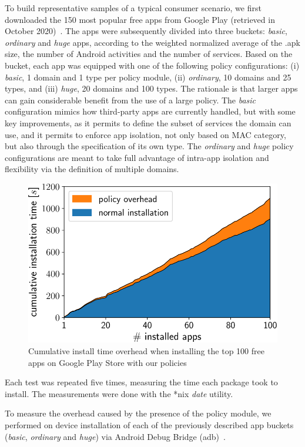 To build representative samples of a typical consumer scenario, we
first downloaded the 150 most popular free apps from Google Play
(retrieved in October 2020)~\cite{seapp_topapps}.  The apps were
subsequently divided into three buckets: \emph{basic}, \emph{ordinary}
and \emph{huge} apps, according to the weighted normalized average of
the .apk size, the number of Android activities and the number of
services.  Based on the bucket, each app was equipped with one of the
following policy configurations: (i) \emph{basic}, 1 domain and 1 type
per policy module, (ii) \emph{ordinary}, 10 domains and 25 types, and
(iii) \emph{huge}, 20 domains and 100 types.  The rationale is that
larger apps can gain considerable benefit from the use of a large
policy.  The \emph{basic} configuration mimics how third-party apps
are currently handled, but with some key improvements, as it permits
to define the subset of services the domain can use, and it permits to
enforce app isolation, not only based on MAC category, but also
through the specification of its own type.  The \emph{ordinary} and
\emph{huge} policy configurations are meant to take full advantage of
intra-app isolation and flexibility via the definition of multiple
domains.
%
\begin{figure}[t]
	\centering
	\includegraphics[width=0.7\columnwidth]{chapters/seapp/data/top100_cumulative}
	\caption[Cumulative install time overhead of the top 100 free apps
      with our policies]{
        \label{fig:seapp_benchmark100} Cumulative install time
        overhead when installing the top 100 free apps on Google Play
        Store with our policies
    }
\end{figure}
%
Each test was repeated five times, measuring the time each package
took to install.  The measurements were done with the *nix {\em date}
utility.

To measure the overhead caused by the presence of the policy module,
we performed on device installation of each of the previously
described app buckets (\emph{basic}, \emph{ordinary} and \emph{huge})
via Android Debug Bridge (adb)~\cite{seapp_adblink}.

